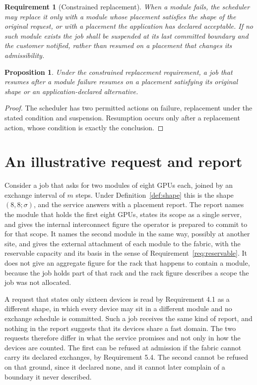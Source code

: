 \documentclass[11pt,openany]{book}
\newtheorem{proposition}{Proposition}[chapter]
\newtheorem{requirement}{Requirement}[chapter]
\theoremstyle{remark}
\begin{document}
\begin{requirement}[Constrained replacement]
When a module fails, the scheduler may replace it only with a module whose placement satisfies the shape of the original request, or with a placement the application has declared acceptable. If no such module exists the job shall be suspended at its last committed boundary and the customer notified, rather than resumed on a placement that changes its admissibility.
\end{requirement}

\begin{proposition}
Under the constrained replacement requirement, a job that resumes after a module failure resumes on a placement satisfying its original shape or an application-declared alternative.
\end{proposition}
\begin{proof}
The scheduler has two permitted actions on failure, replacement under the stated condition and suspension. Resumption occurs only after a replacement action, whose condition is exactly the conclusion.
\end{proof}

\section{An illustrative request and report}

Consider a job that asks for two modules of eight GPUs each, joined by an exchange interval of $m$ steps. Under Definition~\ref{def:shape} this is the shape $(8,8;\sigma)$, and the service answers with a placement report. The report names the module that holds the first eight GPUs, states its scope as a single server, and gives the internal interconnect figure the operator is prepared to commit to for that scope. It names the second module in the same way, possibly at another site, and gives the external attachment of each module to the fabric, with the reservable capacity and its basis in the sense of Requirement~\ref{req:reservable}. It does not give an aggregate figure for the rack that happens to contain a module, because the job holds part of that rack and the rack figure describes a scope the job was not allocated.

A request that states only sixteen devices is read by Requirement 4.1 as a different shape, in which every device may sit in a different module and no exchange schedule is committed. Such a job receives the same kind of report, and nothing in the report suggests that its devices share a fast domain. The two requests therefore differ in what the service promises and not only in how the devices are counted. The first can be refused at admission if the fabric cannot carry its declared exchanges, by Requirement 5.4. The second cannot be refused on that ground, since it declared none, and it cannot later complain of a boundary it never described.
\end{document}
